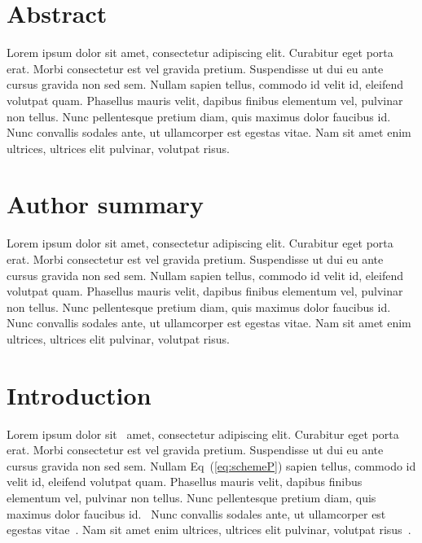\documentclass[10pt,letterpaper]{article}
\begin{document}

%
\section*{Abstract}
Lorem ipsum dolor sit amet, consectetur adipiscing elit. Curabitur eget porta erat. Morbi consectetur est vel gravida pretium. Suspendisse ut dui eu ante cursus gravida non sed sem. Nullam sapien tellus, commodo id velit id, eleifend volutpat quam. Phasellus mauris velit, dapibus finibus elementum vel, pulvinar non tellus. Nunc pellentesque pretium diam, quis maximus dolor faucibus id. Nunc convallis sodales ante, ut ullamcorper est egestas vitae. Nam sit amet enim ultrices, ultrices elit pulvinar, volutpat risus.



%
\section*{Author summary}
Lorem ipsum dolor sit amet, consectetur adipiscing elit. Curabitur eget porta erat. Morbi consectetur est vel gravida pretium. Suspendisse ut dui eu ante cursus gravida non sed sem. Nullam sapien tellus, commodo id velit id, eleifend volutpat quam. Phasellus mauris velit, dapibus finibus elementum vel, pulvinar non tellus. Nunc pellentesque pretium diam, quis maximus dolor faucibus id. Nunc convallis sodales ante, ut ullamcorper est egestas vitae. Nam sit amet enim ultrices, ultrices elit pulvinar, volutpat risus.

\linenumbers

\section*{Introduction}
Lorem ipsum dolor sit~\cite{bib1} amet, consectetur adipiscing elit. Curabitur eget porta erat. Morbi consectetur est vel gravida pretium. Suspendisse ut dui eu ante cursus gravida non sed sem. Nullam Eq~(\ref{eq:schemeP}) sapien tellus, commodo id velit id, eleifend volutpat quam. Phasellus mauris velit, dapibus finibus elementum vel, pulvinar non tellus. Nunc pellentesque pretium diam, quis maximus dolor faucibus id.~\cite{bib2} Nunc convallis sodales ante, ut ullamcorper est egestas vitae~\cite{bib3}. Nam sit amet enim ultrices, ultrices elit pulvinar, volutpat risus~\cite{bib4}.
\end{document}
